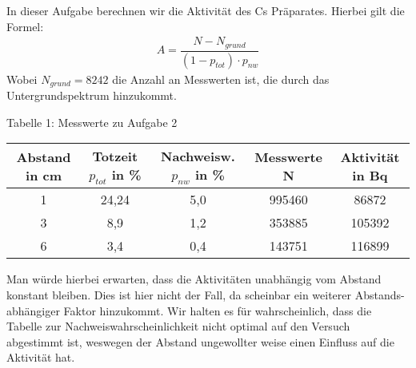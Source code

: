 In dieser Aufgabe berechnen wir die Aktivität des Cs Präparates.
Hierbei gilt die Formel:
\begin{align*}
A=\dfrac{N-N_{grund}}{(1-p_{tot})\cdot p_{nw}}
\end{align*}
Wobei $ N_{grund}=8242 $ die Anzahl an Messwerten ist, die durch das Untergrundspektrum hinzukommt.
\begin{center}
	Tabelle 1: Messwerte zu Aufgabe 2
\end{center}
\begin{center}
	\begin{tabular}{c|c|c|c|c}
		Abstand in cm & Totzeit $p_{tot}$ in \% & Nachweisw. $p_{nw}$ in \% & Messwerte N & Aktivität in Bq \\ \hline
		1       &          24,24          &            5,0            &   995460    &      86872      \\
		3       &           8,9           &            1,2            &   353885    &     105392      \\
		6       &           3,4           &            0,4            &   143751    &     116899
	\end{tabular} 
\end{center}

Man würde hierbei erwarten, dass die Aktivitäten unabhängig vom Abstand konstant bleiben. Dies ist hier nicht der Fall, da scheinbar ein weiterer Abstands-abhängiger Faktor hinzukommt. Wir halten es für wahrscheinlich, dass die Tabelle zur Nachweiswahrscheinlichkeit nicht optimal auf den Versuch abgestimmt ist, weswegen der Abstand ungewollter weise einen Einfluss auf die Aktivität hat.